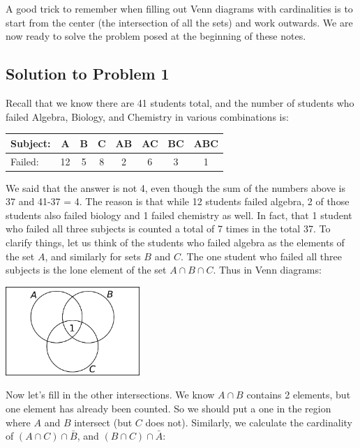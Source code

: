 \documentclass[12pt]{article}
\begin{document}
A good trick to remember when filling out Venn diagrams with cardinalities is to start from the center (the intersection of all the sets) and work outwards.  We are now ready to solve the problem posed at the beginning of these notes.

\subsection{Solution to Problem 1}

Recall that we know there are 41 students total, and the number of students who failed Algebra, Biology, and Chemistry in various combinations is: 

\begin{center}
\begin{tabular}{|l|c|c|c|c|c|c|c|}
\hline
 Subject: & A & B & C & AB & AC & BC & ABC\\
\hline
Failed: & 12 & 5 & 8 & 2 & 6 & 3 & 1\\
\hline
\end{tabular}
\end{center}

We said that the answer is not 4, even though the sum of the numbers above is 37 and 41-37 = 4.  The reason is that while 12 students failed algebra, 2 of those students also failed biology and 1 failed chemistry as well.  In fact, that 1 student who failed all three subjects is counted a total of 7 times in the total 37.  To clarify things, let us think of the students who failed algebra as the elements of the set $A$, and similarly for sets $B$ and $C$.  The one student who failed all three subjects is the lone element of the set $A \cap B \cap C$.  Thus in Venn diagrams:

\begin{center}
 \includegraphics[width=2in]{images/venn3prob1a.png}
\end{center}

Now let's fill in the other intersections.  We know $A\cap B$ contains 2 elements, but one element has already been counted.  So we should put a one in the region where $A$ and $B$ intersect (but $C$ does not).  Similarly, we calculate the cardinality of $(A\cap C) \cap \bar B$, and $(B \cap C) \cap \bar A$:
\end{document}
